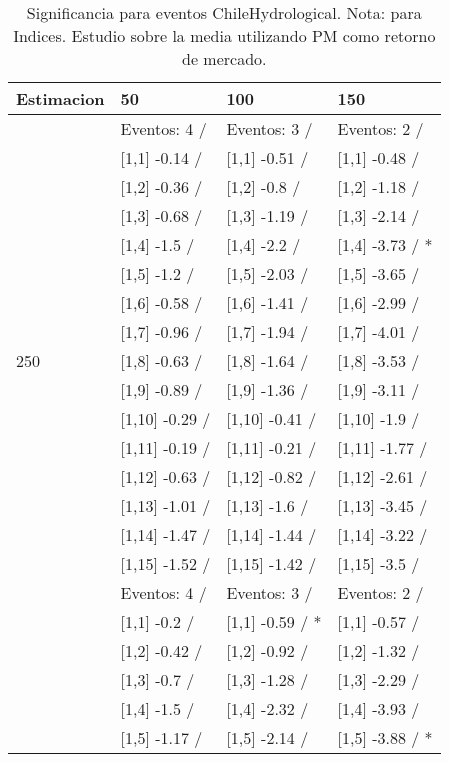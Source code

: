 \begin{table}

\caption{Significancia para eventos ChileHydrological. Nota: para Indices. Estudio sobre la media utilizando PM como retorno de mercado.}
\centering
\begin{tabular}[t]{llll}
\toprule
Estimacion & 50 & 100 & 150\\
\midrule
 & Eventos:  4 / & Eventos:  3 / & Eventos:  2 /\\
 & {}[1,1] -0.14  / & {}[1,1] -0.51  / & {}[1,1] -0.48  /\\
 & {}[1,2] -0.36  / & {}[1,2] -0.8  / & {}[1,2] -1.18  /\\
 & {}[1,3] -0.68  / & {}[1,3] -1.19  / & {}[1,3] -2.14  /\\
 & {}[1,4] -1.5  / & {}[1,4] -2.2  / & {}[1,4] -3.73  / *\\
\addlinespace
 & {}[1,5] -1.2  / & {}[1,5] -2.03  / & {}[1,5] -3.65  /\\
 & {}[1,6] -0.58  / & {}[1,6] -1.41  / & {}[1,6] -2.99  /\\
 & {}[1,7] -0.96  / & {}[1,7] -1.94  / & {}[1,7] -4.01  /\\
250 & {}[1,8] -0.63  / & {}[1,8] -1.64  / & {}[1,8] -3.53  /\\
 & {}[1,9] -0.89  / & {}[1,9] -1.36  / & {}[1,9] -3.11  /\\
\addlinespace
 & {}[1,10] -0.29  / & {}[1,10] -0.41  / & {}[1,10] -1.9  /\\
 & {}[1,11] -0.19  / & {}[1,11] -0.21  / & {}[1,11] -1.77  /\\
 & {}[1,12] -0.63  / & {}[1,12] -0.82  / & {}[1,12] -2.61  /\\
 & {}[1,13] -1.01  / & {}[1,13] -1.6  / & {}[1,13] -3.45  /\\
 & {}[1,14] -1.47  / & {}[1,14] -1.44  / & {}[1,14] -3.22  /\\
\addlinespace
 & {}[1,15] -1.52  / & {}[1,15] -1.42  / & {}[1,15] -3.5  /\\
 & Eventos:  4 / & Eventos:  3 / & Eventos:  2 /\\
 & {}[1,1] -0.2  / & {}[1,1] -0.59  / * & {}[1,1] -0.57  /\\
 & {}[1,2] -0.42  / & {}[1,2] -0.92  / & {}[1,2] -1.32  /\\
 & {}[1,3] -0.7  / & {}[1,3] -1.28  / & {}[1,3] -2.29  /\\
\addlinespace
 & {}[1,4] -1.5  / & {}[1,4] -2.32  / & {}[1,4] -3.93  /\\
 & {}[1,5] -1.17  / & {}[1,5] -2.14  / & {}[1,5] -3.88  / *\\

\end{tabular}
\end{table}

